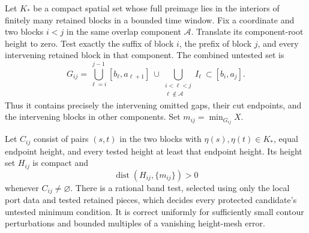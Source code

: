 \begin{lemma}\label{bg:omitted-clearance}
Let \(K_*\) be a compact spatial set whose full preimage lies in the interiors of finitely many retained blocks in a bounded time window. Fix a coordinate and two blocks \(i<j\) in the same overlap component \(\mathcal A\). Translate its component-root height to zero. Test exactly the suffix of block \(i\), the prefix of block \(j\), and every intervening retained block in that component. The combined untested set is
\[
 G_{ij}=\bigcup_{\ell=i}^{j-1}[b_\ell,a_{\ell+1}]
 \ \cup\!\!\bigcup_{\substack{i<\ell<j\\\ell\notin\mathcal A}} I_\ell
 \ \subset[b_i,a_j].
\]
Thus it contains precisely the intervening omitted gaps, their cut endpoints, and the intervening blocks in other components. Set \(m_{ij}=\min_{G_{ij}}X\).

Let \(C_{ij}\) consist of pairs \((s,t)\) in the two blocks with \(\eta(s),\eta(t)\in K_*\), equal endpoint height, and every tested height at least that endpoint height. Its height set \(H_{ij}\) is compact and
\[
 \operatorname{dist}(H_{ij},\{m_{ij}\})>0
\]
whenever \(C_{ij}\ne\varnothing\). There is a rational band test, selected using only the local port data and tested retained pieces, which decides every protected candidate's untested minimum condition. It is correct uniformly for sufficiently small contour perturbations and bounded multiples of a vanishing height-mesh error.
\end{lemma}
